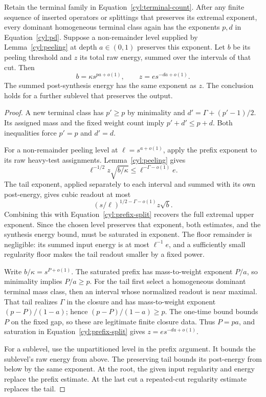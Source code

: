 \begin{proposition}\label{cyl:split-saturation}
Retain the terminal family in Equation~\eqref{cyl:terminal-count}.
After any finite sequence of inserted operators or splittings that
preserves its extremal exponent, every dominant homogeneous terminal
class again has the exponents $p,d$ in Equation~\eqref{cyl:pd}.
Suppose a non-remainder level supplied by Lemma~\ref{cyl:peeling} at
depth $a\in(0,1)$ preserves this exponent. Let $b$ be its peeling
threshold and $z$ its total raw energy, summed over the intervals of
that cut. Then
\begin{equation}\label{cyl:split-benchmarks}
 b=\kappa s^{pa+o(1)},\qquad
 z=e s^{-da+o(1)}.
\end{equation}
The summed post-synthesis energy has the same exponent as $z$.
The conclusion holds for a further sublevel that preserves the output.
\end{proposition}

\begin{proof}
A new terminal class has $p'\ge p$ by minimality and
$d'=\Gamma+(p'-1)/2$.  Its assigned mass and the fixed weight count imply
$p'+d'\le p+d$.  Both inequalities force $p'=p$ and $d'=d$.

For a non-remainder peeling level at $\ell=s^{a+o(1)}$, apply the prefix
exponent to its raw heavy-test assignments.  Lemma~\ref{cyl:peeling}
gives
\begin{equation}\label{cyl:prefix-split}
 \ell^{-1/2}z\sqrt{b/\kappa}
       \le \ell^{-\Gamma-o(1)}e.
\end{equation}
The tail exponent, applied separately to each interval and summed with
its own post-energy, gives cubic readout at most
\[
 (s/\ell)^{1/2-\Gamma-o(1)}z\sqrt b.
\]
Combining this with Equation~\eqref{cyl:prefix-split} recovers the full
extremal upper exponent.  Since the chosen level preserves that exponent,
both estimates, and the synthesis energy bound, must be saturated in
exponent.  The floor remainder is negligible: its summed input energy
is at most $\ell^{-1}e$, and a sufficiently small regularity floor makes
the tail readout smaller by a fixed power.

Write $b/\kappa=s^{P+o(1)}$.  The saturated prefix has mass-to-weight
exponent $P/a$, so minimality implies $P/a\ge p$.  For the tail first
select a homogeneous dominant terminal mass class, then an interval
whose normalized readout is near maximal.  That tail realizes $\Gamma$
in the closure and has mass-to-weight exponent $(p-P)/(1-a)$; hence
$(p-P)/(1-a)\ge p$.  The one-time bound bounds $P$ on the fixed gap, so
these are legitimate finite closure data.  Thus $P=pa$, and saturation
in Equation~\eqref{cyl:prefix-split} gives $z=e s^{-da+o(1)}$.

For a sublevel, use the unpartitioned level in the prefix argument.
It bounds the sublevel's raw energy from above.  The preserving tail
bounds its post-energy from below by the same exponent.  At the root,
the given input regularity and energy replace the prefix estimate.
At the last cut a repeated-cut regularity estimate replaces the tail.
\end{proof}

